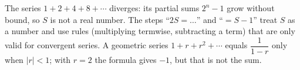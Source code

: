 The series $1+2+4+8+\cdots$ diverges: its partial sums $2^n-1$ grow without bound, so $S$ is not a real number. The steps ``$2S=\ldots$'' and ``$=S-1$'' treat $S$ as a number and use rules (multiplying termwise, subtracting a term) that are only valid for convergent series. A geometric series $1+r+r^2+\cdots$ equals $\dfrac{1}{1-r}$ only when $|r|<1$; with $r=2$ the formula gives $-1$, but that is not the sum.

